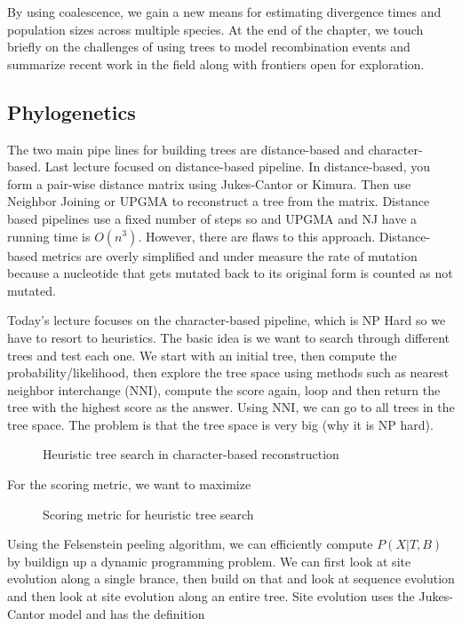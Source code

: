 By using coalescence, we gain a new means for estimating divergence times and population sizes across multiple species. At the end of the chapter, we touch briefly on the challenges of using trees to model recombination events and summarize recent work in the field along with frontiers open for exploration.

\subsection{Phylogenetics}
The two main pipe lines for building trees are distance-based and
character-based. Last lecture focused on distance-based pipeline. In
distance-based, you form a pair-wise distance matrix using
Jukes-Cantor or Kimura. Then use Neighbor Joining or UPGMA to
reconstruct a tree from the matrix. Distance based pipelines use a
fixed number of steps so and UPGMA and NJ have a running time is
$O(n^3)$. However, there are flaws to this approach. Distance-based
metrics are overly simplified and under measure the rate of mutation
because a nucleotide that gets mutated back to its original form is
counted as not mutated.

Today’s lecture focuses on the character-based pipeline, which is NP
Hard so we have to resort to heuristics. The basic idea is we want to
search through different trees and test each one. We start with an
initial tree, then compute the probability/likelihood, then explore
the tree space using methods such as nearest neighbor interchange
(NNI), compute the score again, loop and then return the tree with the
highest score as the answer. Using NNI, we can go to all trees in the
tree space. The problem is that the tree space is very big (why it is
NP hard).

\begin{figure}[ht!]
  \centering
  \caption{Heuristic tree search in character-based reconstruction}
  \label{Fig01_HeuristicTreeSearch}
\end{figure}

\noindent For the scoring metric, we want to maximize

\begin{figure}[ht!]
  \centering
  \caption{Scoring metric for heuristic tree search}
  \label{Fig02_MLScoringStep}
\end{figure}

Using the Felsenstein peeling algorithm, we can efficiently compute
$P(X|T,B)$ by buildign up a dynamic programming problem. We can first
look at site evolution along a single brance, then build on that and
look at sequence evolution and then look at site evolution along an
entire tree. Site evolution uses the Jukes-Cantor model and has the
definition


